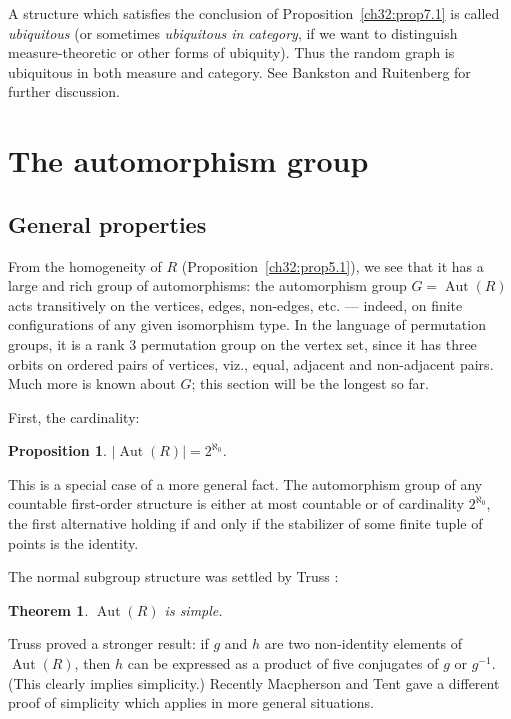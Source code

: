\documentclass{book}
\newtheorem{theorem}{Theorem}
\newtheorem{proposition}{Proposition}
\DeclareMathOperator{\Aut}{Aut}
\begin{document}
A structure which satisfies the conclusion of
Proposition~\ref{ch32:prop7.1} is called \emph{ubiquitous} (or
sometimes \emph{ubiquitous in category}, if we want to distinguish
measure-theoretic or other forms of ubiquity). Thus the random graph
is ubiquitous in both measure and category. See Bankston and
Ruitenberg \cite{ch32:bib1} for further discussion.

\section{The automorphism group}%
\label{ch32:sec2.8}

\subsection{General properties}

From the homogeneity of $R$ (Proposition~\ref{ch32:prop5.1}), we
see that it has a large and rich group of automorphisms: the
automorphism group $G = \Aut(R)$ acts transitively on the
vertices, edges, non-edges, etc. --- indeed, on finite
configurations of any given isomorphism type. In the language of
permutation groups, it is a rank $3$ permutation group on the vertex
set, since it has three orbits on ordered pairs of vertices, viz.,
equal, adjacent and non-adjacent pairs. Much more is known about
$G$; this section will be the longest so far.

First, the cardinality: 

\begin{proposition}\label{ch32:prop8.1} 
$|\Aut(R)| = 2^{\aleph_0}$.
\end{proposition}

This is a special case of a more general fact. The automorphism
group of any countable first-order structure is either at most
countable or of cardinality $2^{\aleph_0}$, the first alternative
holding if and only if the stabilizer of some finite tuple of points
is the identity.

The normal subgroup structure was settled by Truss \cite{ch32:bib51}:

\begin{theorem}\label{ch32:them8.1} 
$\Aut(R)$ is simple.
\end{theorem}

Truss proved a stronger result: if $g$ and $h$ are two non-identity
elements of $\Aut(R)$, then $h$ can be expressed as a
product of five conjugates of $g$ or $g^{-1}$. (This clearly implies
simplicity.) Recently Macpherson and Tent \cite{ch32:new11} gave a
different proof of simplicity which applies in more general situations. 
\end{document}
